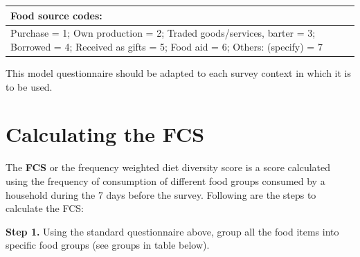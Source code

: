 \documentclass[12pt,]{book}
\theoremstyle{definition}
\theoremstyle{definition}
\theoremstyle{definition}
\theoremstyle{remark}
\begin{document}
\begin{longtable}[]{@{}l@{}}
\toprule
\begin{minipage}[b]{0.97\columnwidth}\raggedright
\textbf{Food source codes:}\strut
\end{minipage}\tabularnewline
\midrule
\endhead
\begin{minipage}[t]{0.97\columnwidth}\raggedright
Purchase = 1; Own production = 2; Traded goods/services, barter = 3;
Borrowed = 4; Received as gifts = 5; Food aid = 6; Others: (specify) =
7\strut
\end{minipage}\tabularnewline
\bottomrule
\end{longtable}

This model questionnaire should be adapted to each survey context in
which it is to be used.

\hypertarget{calculating-the-fcs}{%
\section{Calculating the FCS}\label{calculating-the-fcs}}

The \textbf{FCS} or the frequency weighted diet diversity score is a
score calculated using the frequency of consumption of different food
groups consumed by a household during the 7 days before the survey.
Following are the steps to calculate the FCS:

\textbf{Step 1.} Using the standard questionnaire above, group all the
food items into specific food groups (see groups in table below).
\end{document}
